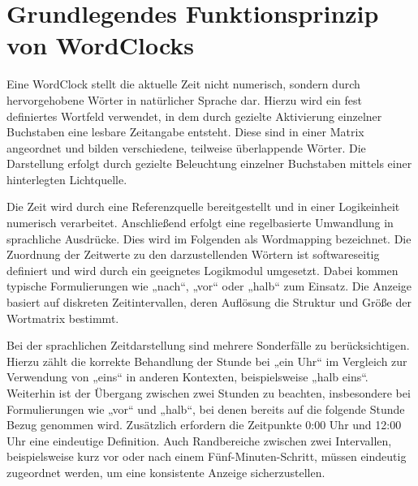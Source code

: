 \section{Grundlegendes Funktionsprinzip von WordClocks}
Eine WordClock stellt die aktuelle Zeit nicht numerisch, sondern durch hervorgehobene Wörter in natürlicher Sprache dar. 
Hierzu wird ein fest definiertes Wortfeld verwendet, in dem durch gezielte Aktivierung einzelner Buchstaben eine lesbare Zeitangabe entsteht.
Diese sind in einer Matrix angeordnet und bilden verschiedene, teilweise überlappende Wörter. 
Die Darstellung erfolgt durch gezielte Beleuchtung einzelner Buchstaben mittels einer hinterlegten Lichtquelle.

Die Zeit wird durch eine Referenzquelle bereitgestellt und in einer Logikeinheit numerisch verarbeitet. 
Anschließend erfolgt eine regelbasierte Umwandlung in sprachliche Ausdrücke.
Dies wird im Folgenden als Wordmapping bezeichnet. 
Die Zuordnung der Zeitwerte zu den darzustellenden Wörtern ist softwareseitig definiert und wird durch ein geeignetes Logikmodul umgesetzt. 
Dabei kommen typische Formulierungen wie „nach“, „vor“ oder „halb“ zum Einsatz. 
Die Anzeige basiert auf diskreten Zeitintervallen, deren Auflösung die Struktur und Größe der Wortmatrix bestimmt.

Bei der sprachlichen Zeitdarstellung sind mehrere Sonderfälle zu berücksichtigen. 
Hierzu zählt die korrekte Behandlung der Stunde bei „ein Uhr“ im Vergleich zur Verwendung von „eins“ in anderen Kontexten, beispielsweise „halb eins“. 
Weiterhin ist der Übergang zwischen zwei Stunden zu beachten, insbesondere bei Formulierungen wie „vor“ und „halb“, bei denen bereits auf die folgende Stunde Bezug genommen wird.
Zusätzlich erfordern die Zeitpunkte 0:00 Uhr und 12:00 Uhr eine eindeutige Definition. 
Auch Randbereiche zwischen zwei Intervallen, beispielsweise kurz vor oder nach einem Fünf-Minuten-Schritt, müssen eindeutig zugeordnet werden, um eine konsistente Anzeige sicherzustellen.